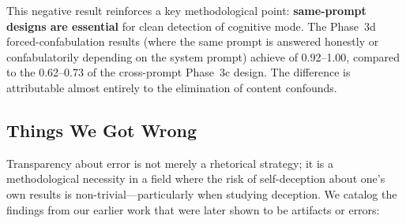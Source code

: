 This negative result reinforces a key methodological point: \textbf{same-prompt designs are essential} for clean detection of cognitive mode.
The Phase~3d forced-confabulation results (where the same prompt is answered honestly or confabulatorily depending on the system prompt) achieve \auroc of 0.92--1.00, compared to the 0.62--0.73 of the cross-prompt Phase~3c design.
The difference is attributable almost entirely to the elimination of content confounds.

\subsection{Things We Got Wrong}
\label{sec:things_wrong}

Transparency about error is not merely a rhetorical strategy; it is a methodological necessity in a field where the risk of self-deception about one's own results is non-trivial---particularly when studying deception.
We catalog the findings from our earlier work that were later shown to be artifacts or errors:

